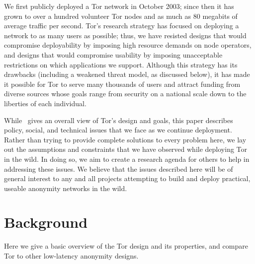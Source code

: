 \documentclass{llncs}
\begin{document}
We first publicly deployed a Tor network in October 2003; since then it has
grown to over a hundred volunteer Tor nodes
and as much as 80 megabits of
average traffic per second.  Tor's research strategy has focused on deploying
a network to as many users as possible; thus, we have resisted designs that
would compromise deployability by imposing high resource demands on node
operators, and designs that would compromise usability by imposing
unacceptable restrictions on which applications we support.  Although this
strategy has
its drawbacks (including a weakened threat model, as discussed below), it has
made it possible for Tor to serve many thousands of users and attract
funding from diverse sources whose goals range from security on a
national scale down to the liberties of each individual.

While~\cite{tor-design} gives an overall view of Tor's
design and goals, this paper describes policy, social, and technical
issues that we face as we continue deployment.
Rather than trying to provide complete solutions to every problem here, we
lay out the assumptions and constraints that we have observed while
deploying Tor in the wild.  In doing so, we aim to create a research agenda
for others to help in addressing these issues.  We believe that the issues
described here will be of general interest to any and all
projects attempting to build
and deploy practical, useable anonymity networks in the wild.


\section{Background}
Here we give a basic overview of the Tor design and its properties, and
compare Tor to other low-latency anonymity designs.
\end{document}

